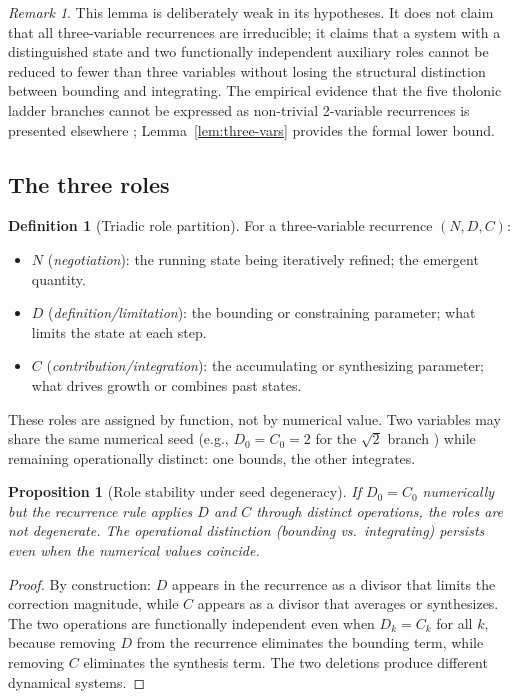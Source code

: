 \documentclass[12pt]{article}
\newtheorem{proposition}[theorem]{Proposition}
\theoremstyle{definition}
\newtheorem{definition}[theorem]{Definition}
\theoremstyle{remark}
\newtheorem{remark}[theorem]{Remark}
\begin{document}
\begin{remark}\label{rem:lemma-weak}
This lemma is deliberately weak in its hypotheses.  It does not claim that all
three-variable recurrences are irreducible; it claims that a system with a distinguished
state and two functionally independent auxiliary roles cannot be reduced to fewer than
three variables without losing the structural distinction between bounding and
integrating.  The empirical evidence that the five tholonic ladder branches cannot be
expressed as non-trivial 2-variable recurrences is presented elsewhere \cite{Mil24};
Lemma~\ref{lem:three-vars} provides the formal lower bound.
\end{remark}

\subsection{The three roles}

\begin{definition}[Triadic role partition]\label{def:triad-roles}
For a three-variable recurrence $(N, D, C)$:
\begin{itemize}
  \item $N$ (\emph{negotiation}): the running state being iteratively refined; the
        emergent quantity.
  \item $D$ (\emph{definition/limitation}): the bounding or constraining parameter;
        what limits the state at each step.
  \item $C$ (\emph{contribution/integration}): the accumulating or synthesizing
        parameter; what drives growth or combines past states.
\end{itemize}
These roles are assigned by function, not by numerical value.  Two variables may share
the same numerical seed (e.g., $D_0 = C_0 = 2$ for the $\sqrt{2}$ branch \cite{Mil24})
while remaining operationally distinct: one bounds, the other integrates.
\end{definition}

\begin{proposition}[Role stability under seed degeneracy]\label{prop:role-stability}
If $D_0 = C_0$ numerically but the recurrence rule applies $D$ and $C$ through distinct
operations, the roles are not degenerate.  The operational distinction (bounding
vs.\ integrating) persists even when the numerical values coincide.
\end{proposition}
\begin{proof}
By construction: $D$ appears in the recurrence as a divisor that limits the correction
magnitude, while $C$ appears as a divisor that averages or synthesizes.  The two
operations are functionally independent even when $D_k = C_k$ for all $k$, because
removing $D$ from the recurrence eliminates the bounding term, while removing $C$
eliminates the synthesis term.  The two deletions produce different dynamical systems.
\end{proof}
\end{document}
